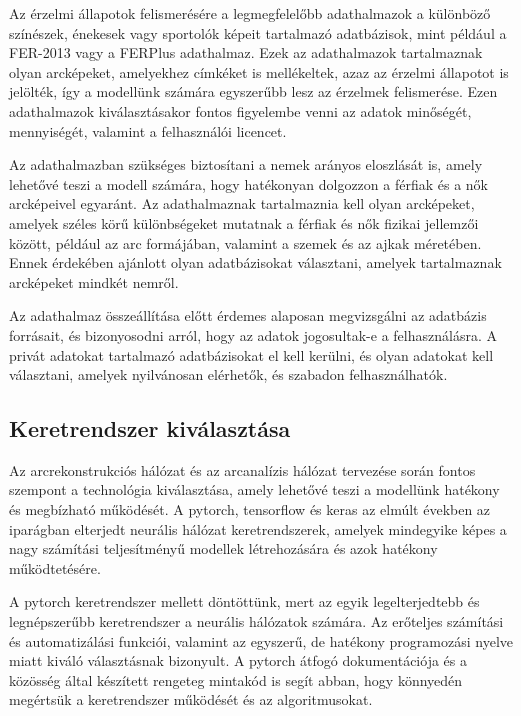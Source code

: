 \documentclass[12pt,a4]{article}
\begin{document}
        Az érzelmi állapotok felismerésére a legmegfelelőbb adathalmazok a különböző színészek, énekesek vagy sportolók képeit tartalmazó adatbázisok, mint például a FER-2013 vagy a FERPlus adathalmaz. Ezek az adathalmazok tartalmaznak olyan arcképeket, amelyekhez címkéket is mellékeltek, azaz az érzelmi állapotot is jelölték, így a modellünk számára egyszerűbb lesz az érzelmek felismerése. Ezen adathalmazok kiválasztásakor fontos figyelembe venni az adatok minőségét, mennyiségét, valamint a felhasználói licencet.

        Az adathalmazban szükséges biztosítani a nemek arányos eloszlását is, amely lehetővé teszi a modell számára, hogy hatékonyan dolgozzon a férfiak és a nők arcképeivel egyaránt. Az adathalmaznak tartalmaznia kell olyan arcképeket, amelyek széles körű különbségeket mutatnak a férfiak és nők fizikai jellemzői között, például az arc formájában, valamint a szemek és az ajkak méretében. Ennek érdekében ajánlott olyan adatbázisokat választani, amelyek tartalmaznak arcképeket mindkét nemről.

        Az adathalmaz összeállítása előtt érdemes alaposan megvizsgálni az adatbázis forrásait, és bizonyosodni arról, hogy az adatok jogosultak-e a felhasználásra. A privát adatokat tartalmazó adatbázisokat el kell kerülni, és olyan adatokat kell választani, amelyek nyilvánosan elérhetők, és szabadon felhasználhatók.
        
        \subsection{Keretrendszer kiválasztása}

        Az arcrekonstrukciós hálózat és az arcanalízis hálózat tervezése során fontos szempont a technológia kiválasztása, amely lehetővé teszi a modellünk hatékony és megbízható működését. A pytorch, tensorflow és keras az elmúlt években az iparágban elterjedt neurális hálózat keretrendszerek, amelyek mindegyike képes a nagy számítási teljesítményű modellek létrehozására és azok hatékony működtetésére.

        A pytorch keretrendszer mellett döntöttünk, mert az egyik legelterjedtebb és legnépszerűbb keretrendszer a neurális hálózatok számára. Az erőteljes számítási és automatizálási funkciói, valamint az egyszerű, de hatékony programozási nyelve miatt kiváló választásnak bizonyult. A pytorch átfogó dokumentációja és a közösség által készített rengeteg mintakód is segít abban, hogy könnyedén megértsük a keretrendszer működését és az algoritmusokat.
        
\end{document}
